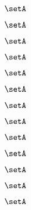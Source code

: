 \begin{forslides}
    \begin{equation}
        \label{eq:slides-processes-142}
        \setA
    \end{equation}

    \begin{equation}
        \label{eq:slides-processes-143}
        \setA
    \end{equation}

    \begin{equation}
        \label{eq:slides-processes-144}
        \setA
    \end{equation}

    \begin{equation}
        \label{eq:slides-processes-145}
        \setA
    \end{equation}

    \begin{equation}
        \label{eq:slides-processes-146}
        \setA
    \end{equation}

    \begin{equation}
        \label{eq:slides-processes-147}
        \setA
    \end{equation}

    \begin{equation}
        \label{eq:slides-processes-148}
        \setA
    \end{equation}

    \begin{equation}
        \label{eq:slides-processes-149}
        \setA
    \end{equation}

    \begin{equation}
        \label{eq:slides-processes-150}
        \setA
    \end{equation}

    \begin{equation}
        \label{eq:slides-processes-151}
        \setA
    \end{equation}

    \begin{equation}
        \label{eq:slides-processes-152}
        \setA
    \end{equation}

    \begin{equation}
        \label{eq:slides-processes-153}
        \setA
    \end{equation}

    \begin{equation}
        \label{eq:slides-processes-154}
        \setA
    \end{equation}


\end{forslides}
